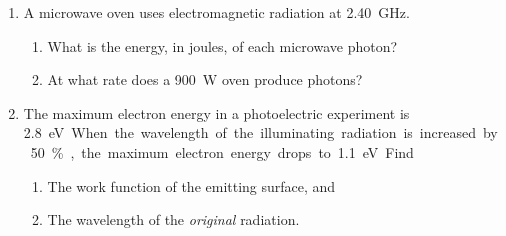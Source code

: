 \begin{enumerate}[itemsep=6pt]
%
%
%  
%  
%  

  
\item A microwave oven uses electromagnetic radiation at \SI{2.40}{\giga\hertz}.
  \begin{enumerate}[itemsep=3pt]
  \item What is the energy, in joules, of each microwave photon?
  \item At what rate does a \SI{900}{\watt} oven produce photons?
  \end{enumerate}

    
\item The maximum electron energy in a photoelectric experiment is
  \SI{2.8}\electronvolt. When the wavelength of the illuminating radiation is
  increased by \SI{50}\percent, the maximum electron energy drops to
  \SI{1.1}\electronvolt. Find
  \begin{enumerate}[itemsep=3pt]
  \item The work function of the emitting surface, and
  \item The wavelength of the \emph{original} radiation.
  \end{enumerate}


\end{enumerate}

